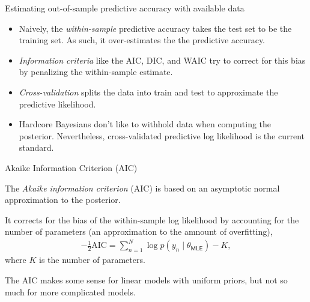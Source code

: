 \documentclass[aspectratio=169]{beamer}
\begin{document}
\begin{frame}{Estimating out-of-sample predictive accuracy with available data}
    
    \begin{itemize}
        \item Naively, the \emph{within-sample} predictive accuracy takes the test set to be the training set. As such, it over-estimates the the predictive accuracy.
    
    \item \emph{Information criteria} like the AIC, DIC, and WAIC try to correct for this bias by penalizing the within-sample estimate.
    
    \item \emph{Cross-validation} splits the data into train and test to approximate the predictive likelihood. 
    
    \item Hardcore Bayesians don't like to withhold data when computing the posterior. Nevertheless, cross-validated predictive log likelihood is the current standard. 
    \end{itemize}

\end{frame}

\begin{frame}{Akaike Information Criterion (AIC)}
    
    The \emph{Akaike information criterion} (AIC) is based on an asymptotic normal approximation to the posterior.
    
    It corrects for the bias of the within-sample log likelihood by accounting for the number of parameters (an approximation to the amnount of overfitting),
    \begin{align}
        -\frac{1}{2} \mathrm{AIC} = \sum_{n=1}^N \log p(y_n \mid \theta_{\mathsf{MLE}}) - K,
    \end{align}
    where $K$ is the number of parameters. 
    
    The AIC makes some sense for linear models with uniform priors, but not so much for more complicated models. 
    
\end{frame}
\end{document}
